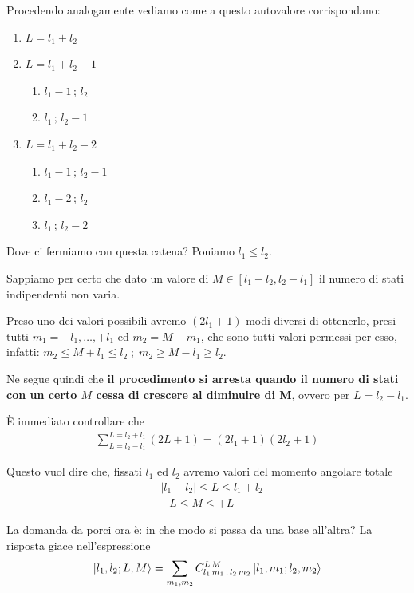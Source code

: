\begin{enumerate}
	Procedendo analogamente vediamo come a questo autovalore corrispondano:
	\begin{enumerate}
		\item $L=l_1 + l_2$ 
		\item $L=l_1 + l_2-1$ 
		\begin{enumerate}
			\item $l_1 - 1 \,;\,l_2$
			\item $l_1 \,;\,l_2 - 1$
		\end{enumerate}
		\item $L=l_1 + l_2-2$
		\begin{enumerate}
			\item $l_1 - 1 \,;\,l_2 - 1$
			\item $l_1 - 2 \,;\,l_2$
			\item $l_1 \,;\,l_2 - 2$
		\end{enumerate}
	\end{enumerate} 
	\end{enumerate}
	
Dove ci fermiamo con questa catena? Poniamo $l_1 \leq l_2$.

Sappiamo per certo che dato un valore di $M \in [l_1-l_2, l_2 - l_1]$ il numero di stati indipendenti non varia.

Preso uno dei valori possibili avremo $(2l_1 + 1)$ modi diversi di ottenerlo, presi tutti $m_1=-l_1,\dots,+l_1$ ed $m_2= M-m_1$, che sono tutti valori permessi per esso, infatti: $m_2 \leq M+l_1 \leq l_2 \; ; \; m_2\geq M-l_1 \geq l_2$.

Ne segue quindi che \textbf{il procedimento si arresta quando il numero di stati con un certo $M$ cessa di crescere al diminuire di M}, ovvero per $L=l_2-l_1$.

È immediato controllare che 
\begin{align}
\sum_{L= l_2-l_1}^{L=l_2+l_1}(2L+1)= (2l_1+1)(2l_2+1)
\end{align}

Questo vuol dire che, fissati $l_1$ ed $l_2$ avremo valori del momento angolare totale
\begin{align}
{}&|l_1 - l_2|\leq L \leq l_1+l_2\\
&-L \leq M \leq +L
\end{align}

La domanda da porci ora è: in che modo si passa da una base all'altra? La risposta giace nell'espressione
\begin{align}
\ket{l_1,l_2;L,M}=\sum_{m_1,m_2}C_{l_1 \, m_1\,;\,l_2 \, m_2}^{L \, M}\ket{l_1,m_1;l_2,m_2}
\end{align}

